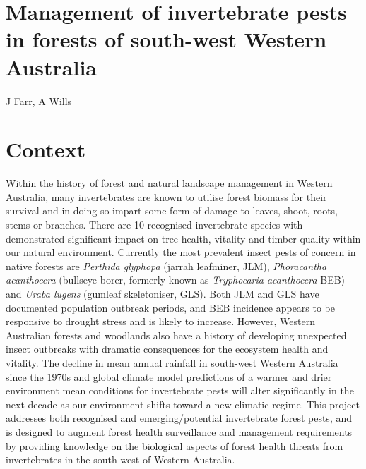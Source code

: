 \documentclass[version=last,
    paper=a4, %
    10pt, %
    usenames,
    dvipsnames,
    oneside, %
    headings=openany, %
    DIV=15 %
]{scrbook}
\begin{document}
\section*{Management of invertebrate pests in forests of south-west Western
Australia
}

J Farr, A Wills


\section*{Context}
Within the history of forest and natural landscape management in Western
Australia, many invertebrates are known to utilise forest biomass for
their survival and in doing so impart some form of damage to leaves,
shoot, roots, stems or branches. There are 10 recognised invertebrate
species with demonstrated significant impact on tree health, vitality
and timber quality within our natural environment. Currently the most
prevalent insect pests of concern in native forests are \emph{Perthida
glyphopa} (jarrah leafminer, JLM), \emph{Phoracantha acanthocera}
(bullseye borer, formerly known as \emph{Tryphocaria acanthocera} BEB)
and \emph{Uraba lugens} (gumleaf skeletoniser, GLS). Both JLM and GLS
have documented population outbreak periods, and BEB incidence appears
to be responsive to drought stress and is likely to increase. However,
Western Australian forests and woodlands also have a history of
developing unexpected insect outbreaks with dramatic consequences for
the ecosystem health and vitality. The decline in mean annual rainfall
in south-west Western Australia since the 1970s and global climate model
predictions of a warmer and drier environment mean conditions for
invertebrate pests will alter significantly in the next decade as our
environment shifts toward a new climatic regime. This project addresses
both recognised and emerging/potential invertebrate forest pests, and is
designed to augment forest health surveillance and management
requirements by providing knowledge on the biological aspects of forest
health threats from invertebrates in the south-west of Western
Australia.
\end{document}
